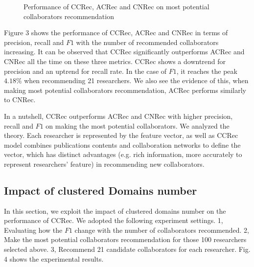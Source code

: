 \documentclass{acm_proc_article-sp}
\begin{document}
\begin{figure}
\centering
{}
\caption{Performance of CCRec, ACRec and CNRec on most potential collaborators recommendation}
\label{fig:3}       %
\end{figure}

Figure 3 shows the performance of CCRec, ACRec and CNRec in terms of precision, recall and $F1$ with the number of recommended collaborators increasing. It can be observed that CCRec significantly outperforms ACRec and CNRec all the time on these three metrics. CCRec shows a downtrend for precision and an uptrend for recall rate. In the case of $F1$, it reaches the peak $4.18\%$ when recommending 21 researchers. We also see the evidence of this, when making most potential collaborators recommendation, ACRec performs similarly to CNRec.

In a nutshell, CCRec outperforms ACRec and CNRec with higher precision, recall and $F1$ on making the most potential collaborators. We analyzed the theory. Each researcher is represented by the feature vector, as well as CCRec model combines publications contents and collaboration networks to define the vector, which has distinct advantages (e.g. rich information, more accurately to represent researchers' feature) in recommending new collaborators.

\subsection{Impact of clustered Domains number}
In this section, we exploit the impact of clustered domains number on the performance of CCRec. We adopted the following experiment settings. 1, Evaluating how the $F1$ change with the number of collaborators recommended. 2, Make the most potential collaborators recommendation for those 100 researchers selected above. 3, Recommend 21 candidate collaborators for each researcher. Fig. 4 shows the experimental results.
\end{document}
